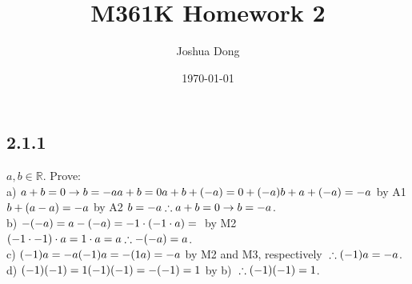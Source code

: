 \documentclass{article}
\begin{document}
\title{M361K\: Homework 2}
\author{Joshua Dong}
\date{\today}
\maketitle

\subsection{2.1.1}
$a, b \in \mathbb{R}$. Prove:
\\a) $a+b = 0 \rightarrow b = -a
\\a+b = 0
\\a+b+(-a) = 0+(-a)
\\b+a+(-a) = -a $ by A1 $
\\b+(a-a) = -a $ by A2 $
\\b = -a
\\\therefore a+b = 0 \rightarrow b = -a$.
\\b) $-(-a) = a
\\-(-a) = -1 \cdot (-1 \cdot a) =
\\$ by M2 $ (-1 \cdot -1) \cdot a =
\\1 \cdot a = a
\\\therefore -(-a) = a$.
\\c) $(-1)a = -a
\\(-1)a = -(1a) = -a $ by M2 and M3, respectively $
\\\therefore (-1)a = -a$.
\\d) $(-1)(-1) = 1
\\(-1)(-1) = -(-1) = 1 $ by b) $
\\\therefore (-1)(-1) = 1$.
\end{document}
